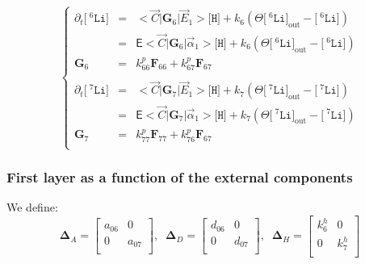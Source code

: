 \documentclass[aps,onecolumn,11pt]{revtex4}
\newcommand{\mychem}[1]{\mathtt{#1}}
\newcommand{\myconc}[1]{\big[#1\big]}
\newcommand{\spLi}[1]{{\!~^{#1}\mychem{Li}}}
\newcommand{\Li}[1]{\myconc{\spLi{#1}}}
\newcommand{\spproton}{\mychem{H}}
\newcommand{\proton}{\myconc{\spproton}}
\newcommand{\myout}[1]{{#1}_{\mathrm{out}}}
\newcommand{\LiOut}[1]{\myout{\Li{#1}}}
\newcommand{\mymat}[1]{{\bm{#1}}}
\begin{document}
\begin{equation}
\left\lbrace
\begin{array}{rcl}
	\partial_t \Li{6} & = & <\vec{C}|\mymat{G}_6|\vec{E}_1> \proton+ k_6\left(\Theta \LiOut{6} - \Li{6}\right)\\
	& = & \mathsf{E} <\vec{C}|\mymat{G}_6|\vec{\alpha}_1> \proton+ k_6\left(\Theta \LiOut{6} - \Li{6}\right)\\
	\mymat{G}_6 &= & k^p_{66} \mymat{F}_{66} + k^p_{67}\mymat{F}_{67} 
	\\
	\\
	\partial_t \Li{7} & = & <\vec{C}|\mymat{G}_7|\vec{E}_1> \proton + k_7\left(\Theta \LiOut{7} - \Li{7}\right)\\
		& = & \mathsf{E} <\vec{C}|\mymat{G}_7|\vec{\alpha}_1> \proton+ k_7\left(\Theta \LiOut{7} - \Li{7}\right)\\
	\mymat{G}_7 & = & k^p_{77} \mymat{F}_{77} + k^p_{76}\mymat{F}_{67} 
	\\
\end{array}
\right.
\end{equation}


\subsubsection{First layer as a function of the external components}
We define:
\begin{equation}
\mymat{\Delta}_A =\begin{bmatrix}
a_{06} & 0 \\
0 & a_{07} \\
\end{bmatrix},\;\;
\mymat{\Delta}_D = 
\begin{bmatrix}
d_{06} & 0 \\
0 & d_{07} \\
\end{bmatrix},\;\;
\mymat{\Delta}_H =
\begin{bmatrix}
k^h_6 & 0 \\
0 & k^h_7 \\
\end{bmatrix}
\end{equation}
\end{document}
